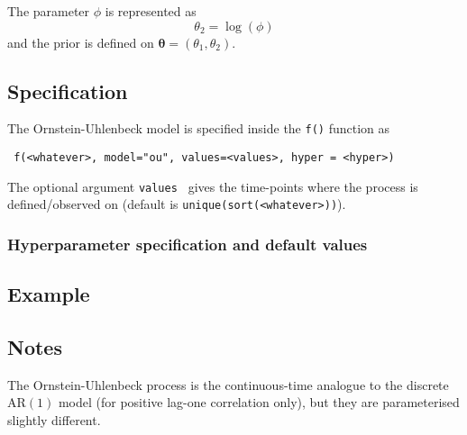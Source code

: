 \documentclass[a4paper,11pt]{article}
\begin{document}
The parameter $\phi$ is represented as
\begin{displaymath}
    \theta_{2} = \log( \phi )
\end{displaymath}
and the prior is defined on $\mathbf{\theta}=(\theta_1,\theta_2)$.

\subsection*{Specification}

The Ornstein-Uhlenbeck model is specified inside the {\tt f()}
function as
\begin{verbatim}
 f(<whatever>, model="ou", values=<values>, hyper = <hyper>)
\end{verbatim}
The optional argument {\tt values } gives the time-points where the process is
defined/observed on (default is \verb|unique(sort(<whatever>))|).

\subsubsection*{Hyperparameter specification and default values}


\subsection*{Example}



\subsection*{Notes}

The Ornstein-Uhlenbeck process is the continuous-time analogue to the
discrete AR$(1)$ model (for positive lag-one correlation only), but
they are parameterised slightly different.
\end{document}
